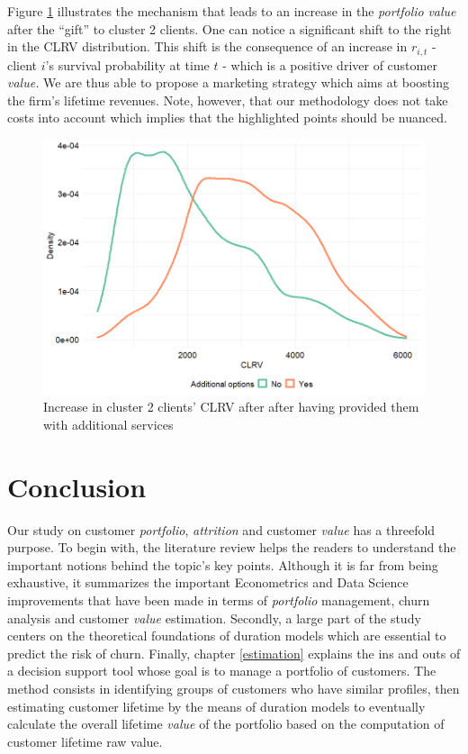 \documentclass[
]{book}
\begin{document}
Figure \ref{fig:clust2CLRV} illustrates the mechanism that leads to an increase in the \emph{portfolio} \emph{value} after the ``gift'' to cluster 2 clients. One can notice a significant shift to the right in the CLRV distribution. This shift is the consequence of an increase in \(r_{i,t}\) - client \(i\)'s survival probability at time \(t\) - which is a positive driver of customer \emph{value.} We are thus able to propose a marketing strategy which aims at boosting the firm's lifetime revenues. Note, however, that our methodology does not take costs into account which implies that the highlighted points should be nuanced.

\begin{figure}

{\centering \includegraphics[width=12.5in]{./imgs/clust2_clrv} 

}

\caption{Increase in cluster 2 clients' CLRV after after having provided them with additional services}\label{fig:clust2CLRV}
\end{figure}

\hypertarget{conclusion}{%
\chapter*{Conclusion}\label{conclusion}}

Our study on customer \emph{portfolio}, \emph{attrition} and customer \emph{value} has a threefold purpose. To begin with, the literature review helps the readers to understand the important notions behind the topic's key points. Although it is far from being exhaustive, it summarizes the important Econometrics and Data Science improvements that have been made in terms of \emph{portfolio} management, churn analysis and customer \emph{value} estimation. Secondly, a large part of the study centers on the theoretical foundations of duration models which are essential to predict the risk of churn. Finally, chapter \ref{estimation} explains the ins and outs of a decision support tool whose goal is to manage a portfolio of customers. The method consists in identifying groups of customers who have similar profiles, then estimating customer lifetime by the means of duration models to eventually calculate the overall lifetime \emph{value} of the portfolio based on the computation of customer lifetime raw value.
\end{document}
